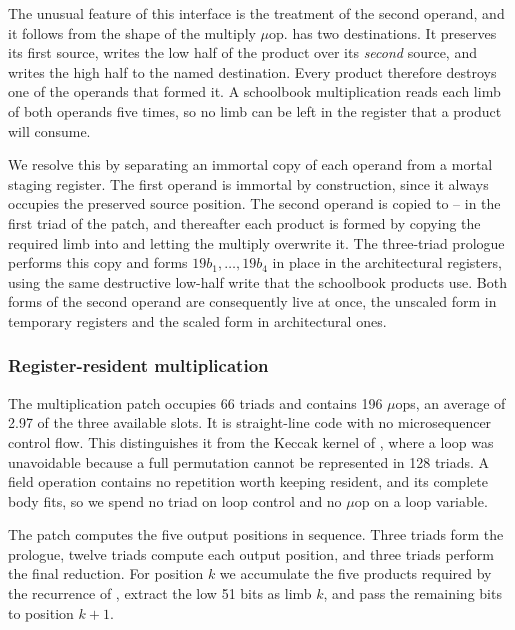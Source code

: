 The unusual feature of this interface is the treatment of the second operand,
and it follows from the shape of the multiply $\mu$op.
 has two destinations.
It preserves its first source, writes the low half of the product over its
\emph{second} source, and writes the high half to the named destination.
Every product therefore destroys one of the operands that formed it.
A schoolbook multiplication reads each limb of both operands five times, so no
limb can be left in the register that a product will consume.

We resolve this by separating an immortal copy of each operand from a mortal
staging register.
The first operand is immortal by construction, since it always occupies the
preserved source position.
The second operand is copied to -- in the first triad of
the patch, and thereafter each product is formed by copying the required limb into
 and letting the multiply overwrite it.
The three-triad prologue performs this copy and forms $19b_1,\ldots,19b_4$ in
place in the architectural registers, using the same destructive low-half write
that the schoolbook products use.
Both forms of the second operand are consequently live at once, the unscaled form
in temporary registers and the scaled form in architectural ones.

\subsubsection{Register-resident multiplication}
\label{sec:c25519-mul}

The multiplication patch occupies 66 triads and contains 196 $\mu$ops, an average
of 2.97 of the three available slots.
It is straight-line code with no microsequencer control flow.
This distinguishes it from the Keccak kernel of , where a loop
was unavoidable because a full permutation cannot be represented in 128 triads.
A field operation contains no repetition worth keeping resident, and its complete
body fits, so we spend no triad on loop control and no $\mu$op on a loop variable.

The patch computes the five output positions in sequence.
Three triads form the prologue, twelve triads compute each output position, and
three triads perform the final reduction.
For position $k$ we accumulate the five products required by the recurrence of
, extract the low 51 bits as limb $k$, and pass the
remaining bits to position $k+1$.

